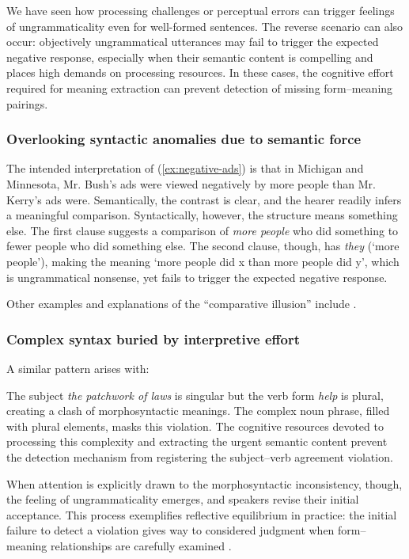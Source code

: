 We have seen how processing challenges or perceptual errors can trigger feelings of ungrammaticality even for well-formed sentences. The reverse scenario can also occur: objectively ungrammatical utterances may fail to trigger the expected negative response, especially when their semantic content is compelling and places high demands on processing resources. In these cases, the cognitive effort required for meaning extraction can prevent detection of missing form--meaning pairings.

\subsubsection{Overlooking syntactic anomalies due to semantic force}


\label{ex:negative-ads}
\z
The intended interpretation of (\ref{ex:negative-ads}) is that in Michigan and Minnesota, Mr. Bush's ads were viewed negatively by more people than Mr. Kerry's ads were. Semantically, the contrast is clear, and the hearer readily infers a meaningful comparison. Syntactically, however, the structure means something else. The first clause suggests a comparison of \textit{more people} who did something to fewer people who did something else. The second clause, though, has \textit{they} (`more people'), making the meaning `more people did x than more people did y', which is ungrammatical nonsense, yet fails to trigger the expected negative response.

Other examples and explanations of the ``comparative illusion'' include \textcite{OConnor2015, Wellwood2018, Leivada2020, zhang2023}.

\subsubsection{Complex syntax buried by interpretive effort}
A similar pattern arises with:
\z

The subject \textit{the patchwork of laws} is singular but the verb form \textit{help} is plural, creating a clash of morphosyntactic meanings. The complex noun phrase, filled with plural elements, masks this violation. The cognitive resources devoted to processing this complexity and extracting the urgent semantic content prevent the detection mechanism from registering the subject--verb agreement violation. 

When attention is explicitly drawn to the morphosyntactic inconsistency, though, the feeling of ungrammaticality emerges, and speakers revise their initial acceptance. This process exemplifies reflective equilibrium in practice: the initial failure to detect a violation gives way to considered judgment when form--meaning relationships are carefully examined \autocite{Pullum2017}.